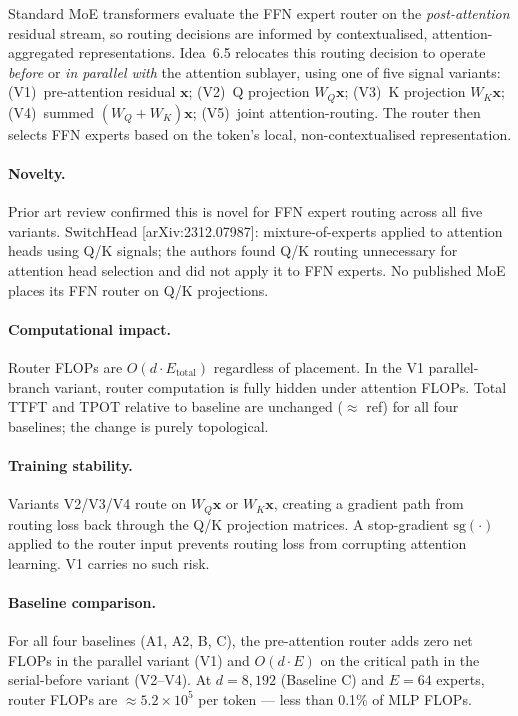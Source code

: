\documentclass[11pt]{article}
\begin{document}
Standard MoE transformers evaluate the FFN expert router on the \emph{post-attention} residual stream, so routing decisions are informed by contextualised, attention-aggregated representations. Idea~6.5 relocates this routing decision to operate \emph{before} or \emph{in parallel with} the attention sublayer, using one of five signal variants: (V1)~pre-attention residual $\mathbf{x}$; (V2)~Q projection $W_Q\mathbf{x}$; (V3)~K projection $W_K\mathbf{x}$; (V4)~summed $(W_Q + W_K)\mathbf{x}$; (V5)~joint attention-routing. The router then selects FFN experts based on the token's local, non-contextualised representation.

\paragraph{Novelty.} Prior art review confirmed this is novel for FFN expert routing across all five variants. SwitchHead [arXiv:2312.07987]: mixture-of-experts applied to attention heads using Q/K signals; the authors found Q/K routing unnecessary for attention head selection and did not apply it to FFN experts. No published MoE places its FFN router on Q/K projections.

\paragraph{Computational impact.} Router FLOPs are $O(d \cdot E_{\text{total}})$ regardless of placement. In the V1 parallel-branch variant, router computation is fully hidden under attention FLOPs. Total TTFT and TPOT relative to baseline are unchanged ($\approx$ ref) for all four baselines; the change is purely topological.

\paragraph{Training stability.} Variants V2/V3/V4 route on $W_Q\mathbf{x}$ or $W_K\mathbf{x}$, creating a gradient path from routing loss back through the Q/K projection matrices. A stop-gradient $\mathrm{sg}(\cdot)$ applied to the router input prevents routing loss from corrupting attention learning. V1 carries no such risk.

\paragraph{Baseline comparison.}
For all four baselines (A1, A2, B, C), the pre-attention router adds zero net FLOPs in the parallel variant (V1) and $O(d \cdot E)$ on the critical path in the serial-before variant (V2--V4). At $d = 8{,}192$ (Baseline C) and $E = 64$ experts, router FLOPs are $\approx 5.2 \times 10^5$ per token --- less than 0.1\% of MLP FLOPs.
\end{document}
